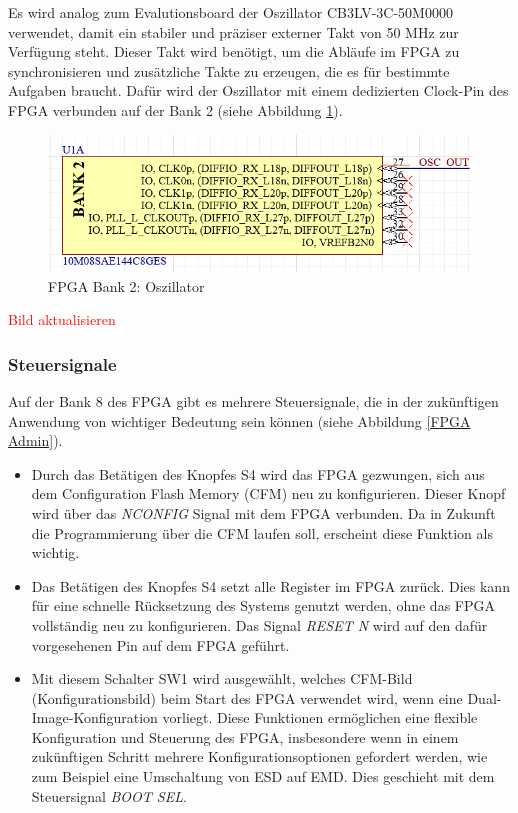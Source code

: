 Es wird analog zum Evalutionsboard der Oszillator CB3LV-3C-50M0000 verwendet, damit ein stabiler und präziser externer Takt von 50 MHz zur Verfügung steht. Dieser Takt wird benötigt, um die Abläufe im FPGA zu synchronisieren und zusätzliche Takte zu erzeugen, die es für bestimmte Aufgaben braucht. Dafür wird der Oszillator mit einem dedizierten Clock-Pin des FPGA verbunden auf der Bank 2 (siehe Abbildung \ref{FPGA OSC}).

\begin{figure}[H]
    \centering
    \includegraphics[width=0.6\linewidth]{Figures/Chap3/Schematics/Bank2_OSC.png}
    \caption{FPGA Bank 2: Oszillator}
    \label{FPGA OSC}
\end{figure}
\textcolor{red}{Bild aktualisieren}

\subsubsection{Steuersignale}

Auf der Bank 8 des FPGA gibt es mehrere Steuersignale, die in der zukünftigen Anwendung von wichtiger Bedeutung sein können (siehe Abbildung \ref{FPGA Admin}).

\begin{itemize}
    \item Durch das Betätigen des Knopfes S4 wird das FPGA gezwungen, sich aus dem Configuration Flash Memory (CFM) neu zu konfigurieren. Dieser Knopf wird über das \textit{NCONFIG} Signal mit dem FPGA verbunden. Da in Zukunft die Programmierung über die CFM laufen soll, erscheint diese Funktion als wichtig.
    
    \item Das Betätigen des Knopfes S4 setzt alle Register im FPGA zurück. Dies kann für eine schnelle Rücksetzung des Systems genutzt werden, ohne das FPGA vollständig neu zu konfigurieren. Das Signal \textit{RESET N} wird auf den dafür vorgesehenen Pin auf dem FPGA geführt.
    
    \item Mit diesem Schalter SW1 wird ausgewählt, welches CFM-Bild (Konfigurationsbild) beim Start des FPGA verwendet wird, wenn eine Dual-Image-Konfiguration vorliegt. Diese Funktionen ermöglichen eine flexible Konfiguration und Steuerung des FPGA, insbesondere wenn in einem zukünftigen Schritt mehrere Konfigurationsoptionen gefordert werden, wie zum Beispiel eine Umschaltung von ESD auf EMD. Dies geschieht mit dem Steuersignal \textit{BOOT SEL}.
\end{itemize}

